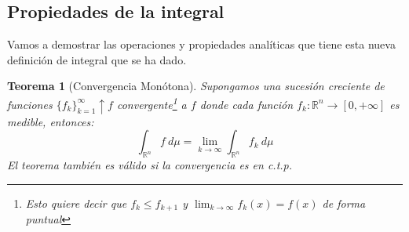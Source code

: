 \documentclass[10pt,a4paper,openright]{book}
\theoremstyle{break}
\newtheorem*{theo}{Teorema}
\begin{document}
\subsection{Propiedades de la integral}
Vamos a demostrar las operaciones y propiedades analíticas que tiene esta nueva definición de integral que se ha dado.

\begin{theo}[Convergencia Monótona]
Supongamos una sucesión creciente de funciones $\{f_k\}_{k=1}^\infty \uparrow f$ convergente\footnote{Esto quiere decir que $f_k \leq f_{k+1}$ y $\lim_{k\rightarrow\infty} f_k(x) = f(x)$ de forma puntual} a $f$ donde cada función $f_k: \mathbb{R}^n \rightarrow \left[0, +\infty\right]$ es medible, entonces:
$$\int_{\mathbb{R}^n}f \ d \mu = \lim_{k\rightarrow\infty} \int_{\mathbb{R}^n} f_k \ d \mu$$
El teorema también es válido si la convergencia es en c.t.p.
\end{theo}
\end{document}
